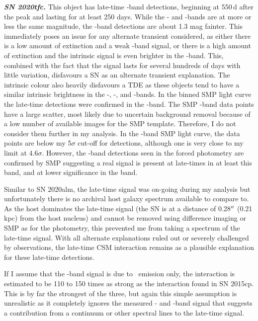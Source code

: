 \documentclass[a4paper,oneside,12pt, class=Latex/Classes/PhDthesisPSnPDF, crop=false]{standalone}
\begin{document}
\textit{\textbf{SN 2020tfc.}}
This object has late-time \ztfg\ztfr\ztfi-band detections, beginning at 550\,d after the peak and lasting for at least 250 days. While the \ztfr- and \ztfi-bands are at more or less the same magnitude, the \ztfg-band detections are about 1.3 mag fainter. This immediately poses an issue for any alternate transient considered, as either there is a low amount of extinction and a weak \ztfg-band signal, or there is a high amount of extinction and the intrinsic signal is even brighter in the \ztfi-band. This, combined with the fact that the signal lasts for several hundreds of days with little variation, disfavours a SN as an alternate transient explanation. The intrinsic colour also heavily disfavours a TDE as these objects tend to have a similar intrinsic brightness in the \ztfg-, \ztfr-, and \ztfi-bands. In the binned SMP light curve the late-time detections were confirmed in the \ztfg-band. The SMP \ztfi-band data points have a large scatter, most likely due to uncertain background removal because of a low number of available images for the SMP template. Therefore, I do not consider them further in my analysis. In the \ztfr-band SMP light curve, the data points are below my 5$\sigma$ cut-off for detections, although one is very close to my limit at 4.6$\sigma$. However, the \ztfg-band detections seen in the forced photometry are confirmed by SMP suggesting a real signal is present at late-times in at least this band, and at lower significance in the \ztfr band. 

Similar to SN 2020alm, the late-time signal was on-going during my analysis but unfortunately there is no archival host galaxy spectrum available to compare to. As the host dominates the late-time signal (the SN is at a distance of 0.28$^{\prime\prime}$ (0.21 kpc) from the host nucleus) and cannot be removed using difference imaging or SMP as for the photometry, this prevented me from taking a spectrum of the late-time signal. With all alternate explanations ruled out or severely challenged by observations, the late-time CSM interaction remains as a plausible explanation for these late-time detections. 

If I assume that the \ztfr-band signal is due to \Halpha~emission only, the interaction is estimated to be 110 to 150 times as strong as the interaction found in SN 2015cp. This is by far the strongest of the three, but again this simple assumption is unrealistic as it completely ignores the measured \ztfg- and \ztfi-band signal that suggests a contribution from a continuum or other spectral lines to the late-time signal. 
 
\end{document}
